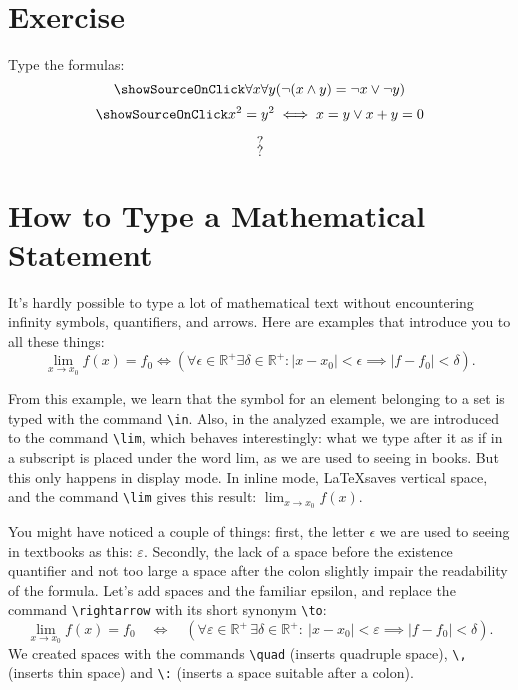 \section{Exercise}
\begin{staticpart}
Type the formulas: \[\showSourceOnClick  \forall x\forall y(\lnot (x\land y)=\lnot x\lor \lnot y) \] \[\showSourceOnClick  x^2 = y^2 \iff x=y \lor x+y=0 \]
\end{staticpart}
\[ ? \]
\[ ? \]

\section{How to Type a Mathematical Statement}
\par It's hardly possible to type a lot of mathematical text without encountering infinity symbols, quantifiers, and arrows. Here are examples that introduce you to all these things:
\[\lim_{x\rightarrow x_0}f(x)=f_0 \iff ( \forall \epsilon\in\mathbb{R}^+ \exists \delta\in\mathbb{R}^+: |x-x_0|<\epsilon \implies |f-f_0|<\delta ). \]
\par From this example, we learn that the symbol for an element belonging to a set is typed with the command \verb"\in". Also, in the analyzed example, we are introduced to the command \verb"\lim"\index{\lim}, which behaves interestingly: what we type after it as if in a subscript is placed under the word lim, as we are used to seeing in books. But this only happens in display mode. In inline mode, \LaTeX saves vertical space, and the command \verb"\lim" gives this result: \( \lim_{x\rightarrow x_0}f(x) \).
\par You might have noticed a couple of things: first, the letter \( \epsilon \) we are used to seeing in textbooks as this: \( \varepsilon \). Secondly, the lack of a space before the existence quantifier and not too large a space after the colon slightly impair the readability of the formula. Let's add spaces and the familiar epsilon, and replace the command \verb"\rightarrow" with its short synonym \verb"\to":
\[\lim_{x\to x_0}f(x)=f_0\quad \iff\quad ( \forall \varepsilon\in\mathbb{R}^+ \, \exists \delta\in\mathbb{R}^+:\: |x-x_0|<\varepsilon \implies |f-f_0|<\delta ). \]
We created spaces with the commands \verb"\quad" (inserts quadruple space), \verb"\," (inserts thin space) and \verb"\:" (inserts a space suitable after a colon).

